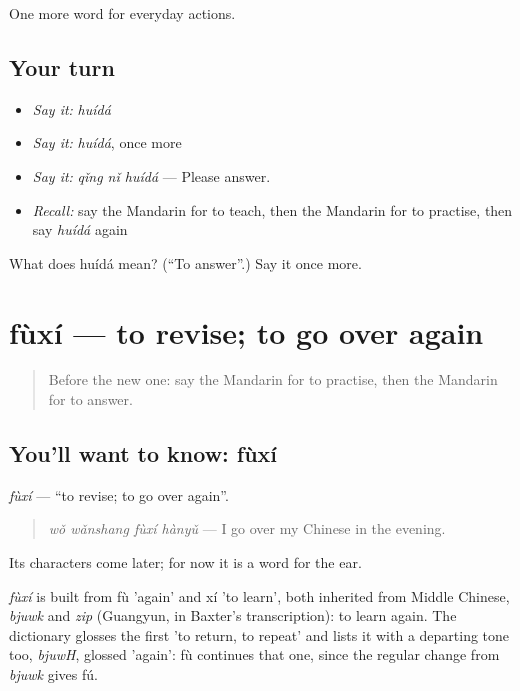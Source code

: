 \begin{grammarlens}[title={What you've built}]
One more word for everyday actions.
\end{grammarlens}

\subsection*{Your turn}
\begin{itemize}
\raggedright
  \item \emph{Say it:} \emph{huídá}
  \item \emph{Say it:} \emph{huídá}, once more
  \item \emph{Say it:} \emph{qǐng nǐ huídá} — Please answer.
  \item \emph{Recall:} say the Mandarin for to teach, then the Mandarin for to practise, then say \emph{huídá} again
\end{itemize}

\begin{tcolorbox}[breakable,colback=teal!4,colframe=teal!35!black,title={Before you move on}]
What does huídá mean? (\textquotedblleft{}To answer\textquotedblright{}.) Say it once more.
\end{tcolorbox}
\section[fùxí]{fùxí — to revise; to go over again}

\label{lesson:ZH-C121-fuxi}



\begin{quote}
Before the new one: say the Mandarin for to practise, then the Mandarin for to answer.
\end{quote}

\subsection*{You'll want to know: fùxí}
\emph{fùxí} — \textquotedblleft{}to revise; to go over again\textquotedblright{}.

\begin{quote}
\emph{wǒ wǎnshang fùxí hànyǔ} — I go over my Chinese in the evening.
\end{quote}

Its characters come later; for now it is a word for the ear.

\begin{cousinweb}
\emph{fùxí} is built from fù 'again' and xí 'to learn', both inherited from Middle Chinese, \emph{bjuwk} and \emph{zip} (Guangyun, in Baxter's transcription): to learn again. The dictionary glosses the first 'to return, to repeat' and lists it with a departing tone too, \emph{bjuwH}, glossed 'again': fù continues that one, since the regular change from \emph{bjuwk} gives fú.
\end{cousinweb}

